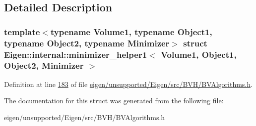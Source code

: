 \subsection{Detailed Description}
\subsubsection*{template$<$typename Volume1, typename Object1, typename Object2, typename Minimizer$>$\newline
struct Eigen\+::internal\+::minimizer\+\_\+helper1$<$ Volume1, Object1, Object2, Minimizer $>$}



Definition at line \hyperlink{eigen_2unsupported_2_eigen_2src_2_b_v_h_2_b_v_algorithms_8h_source_l00183}{183} of file \hyperlink{eigen_2unsupported_2_eigen_2src_2_b_v_h_2_b_v_algorithms_8h_source}{eigen/unsupported/\+Eigen/src/\+B\+V\+H/\+B\+V\+Algorithms.\+h}.



The documentation for this struct was generated from the following file\+:\begin{DoxyCompactItemize}
\item 
eigen/unsupported/\+Eigen/src/\+B\+V\+H/\+B\+V\+Algorithms.\+h\end{DoxyCompactItemize}
